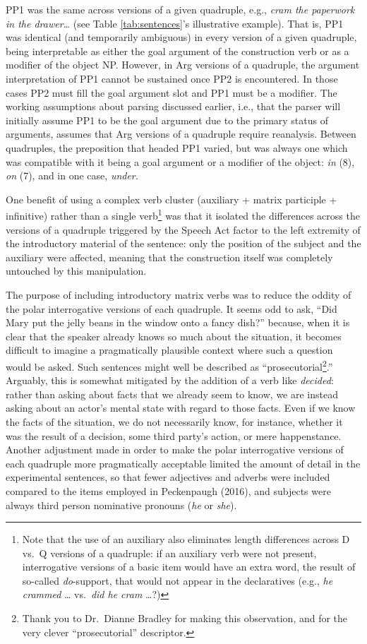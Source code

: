\documentclass[12pt,oneside]{book}
\let\rmarkdownfootnote\footnote%
\def\footnote{\protect\rmarkdownfootnote}
\begin{document}
PP1 was the same across versions of a given quadruple, e.g., \emph{cram the paperwork in the drawer\ldots{}} (see Table \ref{tab:sentences}'s illustrative example). That is, PP1 was identical (and temporarily ambiguous) in every version of a given quadruple, being interpretable as either the goal argument of the construction verb or as a modifier of the object NP. However, in Arg versions of a quadruple, the argument interpretation of PP1 cannot be sustained once PP2 is encountered. In those cases PP2 must fill the goal argument slot and PP1 must be a modifier. The working assumptions about parsing discussed earlier, i.e., that the parser will initially assume PP1 to be the goal argument due to the primary status of arguments, assumes that Arg versions of a quadruple require reanalysis. Between quadruples, the preposition that headed PP1 varied, but was always one which was compatible with it being a goal argument or a modifier of the object: \emph{in} (8), \emph{on} (7), and in one case, \emph{under.}

One benefit of using a complex verb cluster (auxiliary + matrix participle + infinitive) rather than a single verb\footnote{Note that the use of an auxiliary also eliminates length differences across D vs.~Q versions of a quadruple: if an auxiliary verb were not present, interrogative versions of a basic item would have an extra word, the result of so-called \emph{do}-support, that would not appear in the declaratives (e.g., \emph{he crammed} \ldots{} vs.~\emph{did he cram} \ldots{}?)} was that it isolated the differences across the versions of a quadruple triggered by the Speech Act factor to the left extremity of the introductory material of the sentence: only the position of the subject and the auxiliary were affected, meaning that the construction itself was completely untouched by this manipulation.

The purpose of including introductory matrix verbs was to reduce the oddity of the polar interrogative versions of each quadruple. It seems odd to ask, ``Did Mary put the jelly beans in the window onto a fancy dish?'' because, when it is clear that the speaker already knows so much about the situation, it becomes difficult to imagine a pragmatically plausible context where such a question would be asked. Such sentences might well be described as ``prosecutorial\footnote{Thank you to Dr.~Dianne Bradley for making this observation, and for the very clever ``prosecutorial'' descriptor.}.'' Arguably, this is somewhat mitigated by the addition of a verb like \emph{decided}: rather than asking about facts that we already seem to know, we are instead asking about an actor's mental state with regard to those facts. Even if we know the facts of the situation, we do not necessarily know, for instance, whether it was the result of a decision, some third party's action, or mere happenstance. Another adjustment made in order to make the polar interrogative versions of each quadruple more pragmatically acceptable limited the amount of detail in the experimental sentences, so that fewer adjectives and adverbs were included compared to the items employed in Peckenpaugh (2016), and subjects were always third person nominative pronouns (\emph{he} or \emph{she}).
\end{document}
